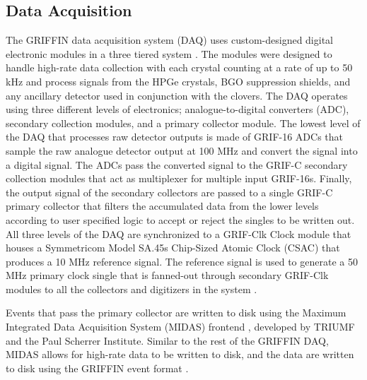 \documentclass[cnatzke_thesis_proposal.tex]{subfiles}
\begin{document}
\subsection{Data Acquisition}
\label{sec:data_acquisition}
The GRIFFIN data acquisition system (DAQ) uses custom-designed digital electronic modules in a three tiered system \cite{garnsworthy_griffin_2017}. 
The modules were designed to handle high-rate data collection with each crystal counting at a rate of up to 50 kHz and process signals from the HPGe crystals, BGO suppression shields, and any ancillary detector used in conjunction with the clovers. 
The DAQ operates using three different levels of electronics; analogue-to-digital converters (ADC), secondary collection modules, and a primary collector module. The lowest level of the DAQ that processes raw detector outputs is made of GRIF-16 ADCs that sample the raw analogue detector output at 100 MHz and convert the signal into a digital signal.
The ADCs pass the converted signal to the GRIF-C secondary collection modules that act as multiplexer for multiple input GRIF-16s. 
Finally, the output signal of the secondary collectors are passed to a single GRIF-C primary collector that filters the accumulated data from the lower levels according to user specified logic to accept or reject the singles to be written out. 
All three levels of the DAQ are synchronized to a GRIF-Clk Clock module that houses a Symmetricom Model SA.45s Chip-Sized Atomic Clock (CSAC) that produces a 10 MHz reference signal. 
The reference signal is used to generate a 50 MHz primary clock single that is fanned-out through secondary GRIF-Clk modules to all the collectors and digitizers in the system \cite{garnsworthy_griffin_2017}.

Events that pass the primary collector are written to disk using the Maximum Integrated Data Acquisition System (MIDAS) frontend \cite{ritt_midas_1997}, developed by TRIUMF and the Paul Scherrer Institute. 
Similar to the rest of the GRIFFIN DAQ, MIDAS allows for high-rate data to be written to disk, and the data are written to disk using the GRIFFIN event format \cite{griffin_griffin_nodate}. 

\end{document}

